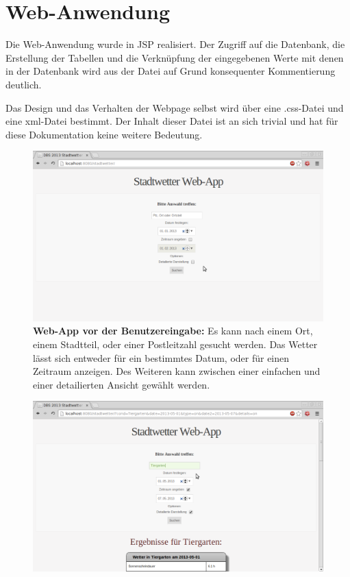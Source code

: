 \documentclass[11pt,a4paper,DIV=10,]{scrartcl}
\begin{document}
\section{Web-Anwendung}
Die Web-Anwendung wurde in JSP realisiert. Der Zugriff auf die Datenbank, die Erstellung der Tabellen und die Verknüpfung der eingegebenen Werte mit denen in der Datenbank wird aus der Datei auf Grund konsequenter Kommentierung deutlich.  



Das Design und das Verhalten der Webpage selbst wird über eine .css-Datei und eine xml-Datei bestimmt. Der Inhalt dieser Datei ist an sich trivial und hat für diese Dokumentation keine weitere Bedeutung. 
\begin{center}
\begin{figure}[H]
\includegraphics[scale=0.4]{Web-App_1}
\caption{\textbf{Web-App vor der Benutzereingabe:} Es kann nach einem Ort, einem Stadtteil, oder einer Postleitzahl gesucht werden. Das Wetter lässt sich entweder für ein bestimmtes Datum, oder für einen Zeitraum anzeigen. Des Weiteren kann zwischen einer einfachen und einer detailierten Ansicht gewählt werden.}
\end{figure}
\begin{figure}[H]
\includegraphics[scale=0.4]{Web-App_2}

\end{figure}
\end{center}
\end{document}
